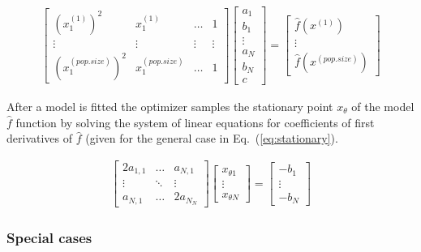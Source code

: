 \documentclass[manuscript]{acmart}
\begin{document}
\begin{align}
	\begin{bmatrix}
		(x^{(1)}_1)^2 & x^{(1)}_1 &  \ldots & 1 \\           
   \vdots & \vdots  & \vdots &  \vdots  \\
   (x^{(pop.size)}_1)^2 & x^{(pop.size)}_1 & \ldots & 1
  \end{bmatrix} 
  \begin{bmatrix}
	a_{1} \\           
	b_{1} \\           
	\vdots \\
	a_{N} \\           
	b_{N} \\           
	c
   \end{bmatrix}
	=
	\begin{bmatrix}
		\hat{f}(x^{(1)}) \\           
		\vdots \\
		\hat{f}(x^{(pop.size)})
	   \end{bmatrix}
	 \label{eq:coef}
\end{align}

After a model is fitted the optimizer samples the stationary point $x_\theta$
of the model $\hat{f}$ function by solving the system of linear equations for coefficients of first derivatives of $\hat{f}$ (given for the general case in Eq.~(\ref{eq:stationary}).

\begin{align}
			\begin{bmatrix}
				2a_{1,1} & \ldots & a_{N,1} \\           
           \vdots & \ddots & \vdots   \\
           a_{N,1} & \ldots & 2a_{N_N}
          \end{bmatrix} 
		  \begin{bmatrix}
			x_{\theta1} \\           
			\vdots \\
			x_{\theta N}
		   \end{bmatrix}
			=
	  \begin{bmatrix}
           -b_1 \\
           \vdots \\
           -b_N
         \end{bmatrix}
		 \label{eq:stationary}
  \end{align}

\subsubsection{Special cases}
\end{document}
